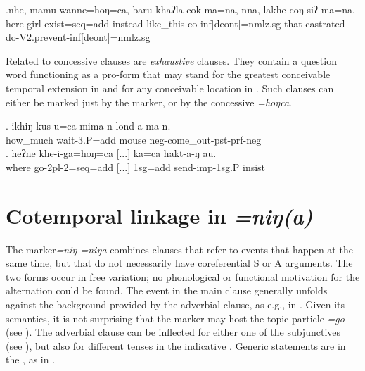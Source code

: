  \exg.nhe, mamu wanne=hoŋ=ca,  baru   khaʔla   cok-ma=na,  nna, lakhe     coŋ-siʔ-ma=na.\\
 here girl exist{\sc [3;npst]=seq=add} instead like\_this co{\sc -inf[deont]=nmlz.sg} that castrated do{\sc -V2.prevent-inf[deont]=nmlz.sg}\\
  
 
 Related to concessive clauses are \emph{exhaustive} clauses. They contain a question word functioning as a pro-form that may stand for the greatest conceivable temporal extension in \Next[a] and for any conceivable location in \Next[b]. Such clauses can either be marked just by the  marker, or by the concessive \emph{=hoŋca}.
 
 \exg. ikhiŋ   kus-u=ca                        mima  n-lond-a-ma-n.\\
 how\_much wait{\sc -3.P=add} mouse {\sc neg-}come\_out{\sc -pst-prf-neg}\\
  
\bg. heʔne khe-i-ga=hoŋ=ca      [...]         ka=ca         hakt-a-ŋ          au.\\
where go{\sc -2pl-2=seq=add} [...] {\sc 1sg=add} send{\sc -imp-1sg.P} {\sc insist}\\
 


\section{Cotemporal linkage in \emph{=niŋ(a)}}\label{sim-finite}

The   marker\emph{=niŋ \ti =niŋa} combines clauses that refer to  events that happen at the same time, but that do not necessarily have coreferential S or A arguments. The two forms occur in free variation; no phonological or functional motivation for the alternation could be found. The event in the main clause generally unfolds against the background provided by the adverbial clause, as e.g., in \Next. Given its semantics, it is not surprising that the marker may  host the  topic particle \emph{=go} (see \Next[b]). The adverbial clause can be inflected for either one of the subjunctives (see ), but also for different  tenses in the indicative . Generic statements are in the , as in  \Next[a].


